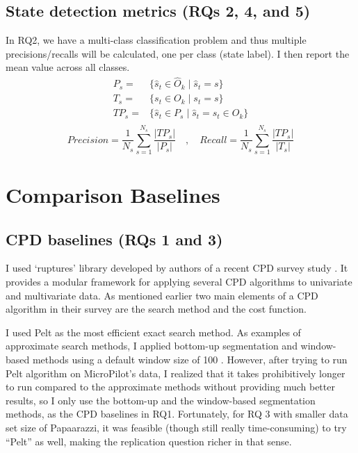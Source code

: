 \subsection{State detection metrics (RQs 2, 4, and 5)}
In RQ2, we have a multi-class classification problem and thus multiple precisions/recalls will be calculated, one per class (state label). I then report the mean value across all classes. 
\begin{equation}
\begin{split}
P_s ={}&{}\big\{\hat{s}_t \in \hat{O}_k \;\big|\; \hat{s}_t = s\big\} \\
T_s ={}&{}\big\{s_t \in O_k \;\big|\; s_t = s\big\} \\
TP_s ={}&{}\big\{\hat{s}_t \in P_s \;\big|\; \hat{s}_t = s_t \in O_k\big\} \\
\end{split}
\end{equation}
$$Precision =\frac{1}{N_s}\sum_{s=1}^{N_s} \frac{|TP_s|}{|P_s|} \quad,\quad Recall = \frac{1}{N_s}\sum_{s=1}^{N_s} \frac{|TP_s|}{|T_s|}$$

\section{Comparison Baselines} 
\subsection{CPD baselines (RQs 1 and 3)} \label{sec:CPD_baseline}
I used `ruptures' library developed by authors of a recent CPD survey study \cite{Truong2018ChangePointSurvey}. It provides a modular framework for applying several CPD algorithms to univariate and multivariate data. %
As mentioned earlier two main elements of a CPD algorithm in their survey are the search method and the cost function.

I used Pelt \cite{killick2012optimal} as the most efficient exact search method. As examples of approximate search methods, I applied bottom-up segmentation and window-based methods using a default window size of 100 \cite{keogh2001online}.
However, after trying to run Pelt algorithm on MicroPilot's data, I realized that it takes prohibitively longer to run compared to the approximate methods without providing much better results, so I only use the bottom-up and the window-based segmentation methods, as the CPD baselines in RQ1.
Fortunately, for RQ 3 with smaller data set size of Papaarazzi, it was feasible (though still really time-consuming) to try ``Pelt'' as well, making the replication question richer in that sense.

